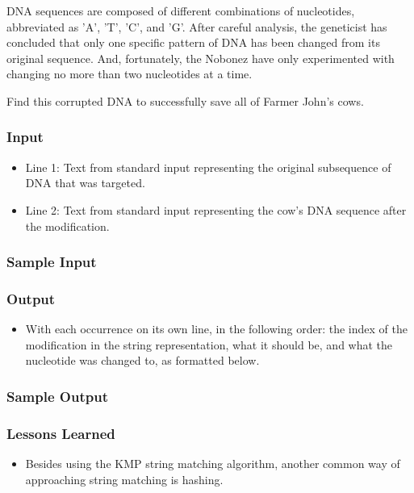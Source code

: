 DNA sequences are composed of different combinations of nucleotides, abbreviated as 'A', 'T', 'C', and 'G'.
After careful analysis, the geneticist has concluded that only one specific pattern of DNA has been changed from its original sequence.
And, fortunately, the Nobonez have only experimented with changing no more than two nucleotides at a time.

Find this corrupted DNA to successfully save all of Farmer John's cows.

\subsubsection{Input}
\begin{itemize}
\item Line 1: Text from standard input representing the original subsequence of DNA that was targeted.
\item Line 2: Text from standard input representing the cow's DNA sequence after the modification.
\end{itemize}

\subsubsection{Sample Input}

\subsubsection{Output}
\begin{itemize}
\item With each occurrence on its own line, in the following order:
	the index of the modification in the string representation, what it should be, and what the nucleotide was changed to, as formatted below.
\end{itemize}

\subsubsection{Sample Output}

\subsubsection{Lessons Learned}
\begin{itemize}
	\item Besides using the KMP string matching algorithm, another common way of approaching string matching is hashing.
\end{itemize}

